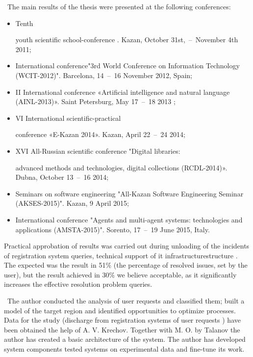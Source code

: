 \probation\
 The main results of the thesis were presented at the following conferences:
\begin{itemize}
	\item Tenth 

youth scientific school-conference . Kazan, October 31st,~--~November 4th 2011;
	\item  International conference"3rd World Conference on Information Technology (WCIT-2012)". Barcelona, 14~--~16 November 2012, Spain; 
	\item II International conference «Artificial intelligence and natural language (AINL-2013)». Saint Petersburg, May 17~--~18 2013 ;
	\item VI International scientific-practical 

conference «E-Kazan 2014». Kazan, April 22~--~24 2014;
	\item XVI All-Russian scientific conference "Digital libraries: 

advanced methods and technologies, digital collections (RCDL-2014)». Dubna, October 13~--~16 2014; 
	\item Seminars on software engineering "All-Kazan Software Engineering Seminar (AKSES-2015)". Kazan, 9 April 2015;
	\item International conference "Agents and multi-agent systems: technologies and applications (AMSTA-2015)". Sorento, 17~--~19 June 2015, Italy.
\end{itemize}Practical approbation of results was carried out during unloading of the incidents of registration system queries, technical support of it infrastructurestructure \icl. The expected was the result in 51\% (the percentage of resolved issues, set by the user), but the result achieved in 30\% we believe acceptable, as it significantly increases the effective resolution problem queries. \par
\contribution\ The author conducted the analysis of user requests and classified them; built a model of the target region and identified opportunities to optimize processes. Data for the study (discharge from registration systems of user requests \iclshort) have been obtained the help of A. V. Krechov.  Together with M. O. by Talanov the author has created a basic architecture of the system. The author has developed system components tested systems on experimental data and fine-tune its work. \par
